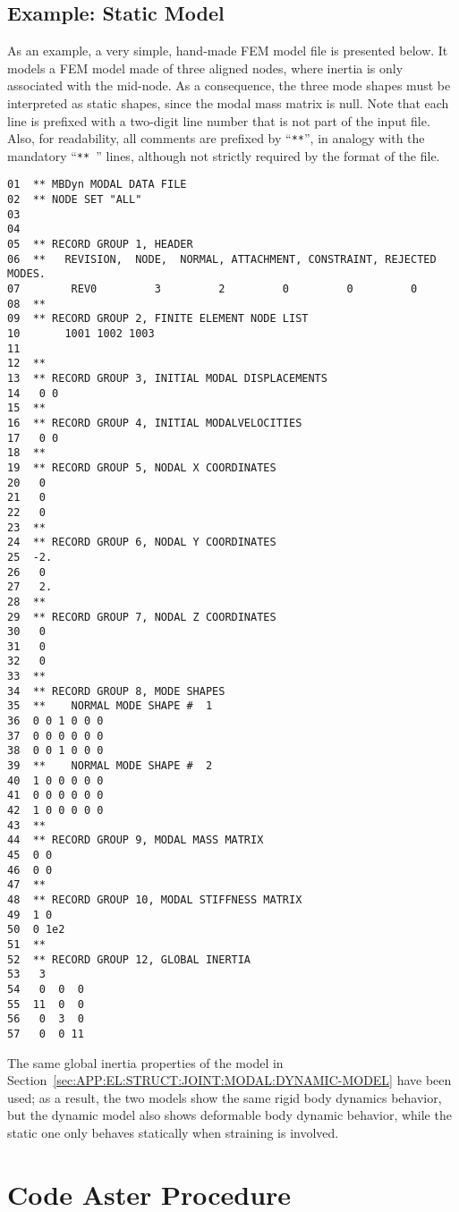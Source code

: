 \subsection{Example: Static Model}
As an example, a very simple, hand-made FEM model file is presented below.
It models a FEM model made of three aligned nodes, where inertia 
is only associated with the mid-node.
As a consequence, the three mode shapes must be interpreted as static
shapes, since the modal mass matrix is null.
Note that each line is prefixed with a two-digit line number 
that is not part of the input file.
Also, for readability, all comments are prefixed by ``\texttt{**}'', in analogy
with the mandatory ``\texttt{** }'' lines, although not strictly 
required by the format of the file.

\noindent
{\small
\begin{verbatim}
01  ** MBDyn MODAL DATA FILE
02  ** NODE SET "ALL" 
03    
04    
05  ** RECORD GROUP 1, HEADER
06  **   REVISION,  NODE,  NORMAL, ATTACHMENT, CONSTRAINT, REJECTED MODES.
07        REV0         3         2         0         0         0
08  **
09  ** RECORD GROUP 2, FINITE ELEMENT NODE LIST
10       1001 1002 1003
11  
12  **
13  ** RECORD GROUP 3, INITIAL MODAL DISPLACEMENTS
14   0 0
15  **
16  ** RECORD GROUP 4, INITIAL MODALVELOCITIES
17   0 0
18  **
19  ** RECORD GROUP 5, NODAL X COORDINATES
20   0
21   0
22   0
23  **
24  ** RECORD GROUP 6, NODAL Y COORDINATES
25  -2.
26   0
27   2.
28  **
29  ** RECORD GROUP 7, NODAL Z COORDINATES
30   0
31   0
32   0
33  **
34  ** RECORD GROUP 8, MODE SHAPES
35  **    NORMAL MODE SHAPE #  1
36  0 0 1 0 0 0
37  0 0 0 0 0 0
38  0 0 1 0 0 0
39  **    NORMAL MODE SHAPE #  2
40  1 0 0 0 0 0
41  0 0 0 0 0 0
42  1 0 0 0 0 0
43  **
44  ** RECORD GROUP 9, MODAL MASS MATRIX
45  0 0
46  0 0
47  **
48  ** RECORD GROUP 10, MODAL STIFFNESS MATRIX
49  1 0
50  0 1e2
51  **
52  ** RECORD GROUP 12, GLOBAL INERTIA
53   3
54   0  0  0
55  11  0  0
56   0  3  0
57   0  0 11
\end{verbatim}
}

The same global inertia properties of the model 
in Section~\ref{sec:APP:EL:STRUCT:JOINT:MODAL:DYNAMIC-MODEL} have been used;
as a result, the two models show the same rigid body dynamics behavior,
but the dynamic model also shows deformable body dynamic behavior, while
the static one only behaves statically when straining is involved.





\section{Code Aster Procedure}
\label{sec:APP:EL:STRUCT:JOINT:MODAL:ASTER}

